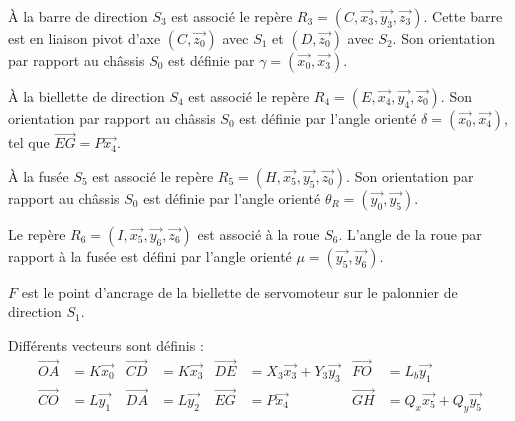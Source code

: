 À la barre de direction $S_3$ est associé le repère $R_3 = (C, \overrightarrow{x_3}, \overrightarrow{y_3}, \overrightarrow{z_3})$. Cette barre est en liaison pivot d'axe $(C, \overrightarrow{z_0})$ avec $S_1$ et $(D, \overrightarrow{z_0})$ avec $S_2$. Son orientation par rapport au châssis $S_0$ est définie par $\gamma = (\overrightarrow{x_0}, \overrightarrow{x_3})$.

À la biellette de direction $S_4$ est associé le repère $R_4 = (E, \overrightarrow{x_4}, \overrightarrow{y_4}, \overrightarrow{z_0})$. Son orientation par rapport au châssis $S_0$ est définie par l'angle orienté $\delta = (\overrightarrow{x_0}, \overrightarrow{x_4})$, tel que $\overrightarrow{EG} = P \overrightarrow{x_4}$.

À la fusée $S_5$ est associé le repère $R_5 = (H, \overrightarrow{x_5}, \overrightarrow{y_5}, \overrightarrow{z_0})$. Son orientation par rapport au châssis $S_0$ est définie par l'angle orienté $\theta_R = (\overrightarrow{y_0}, \overrightarrow{y_5})$.

Le repère $R_6 = (I, \overrightarrow{x_5}, \overrightarrow{y_6}, \overrightarrow{z_6})$ est associé à la roue $S_6$. L'angle de la roue par rapport à la fusée est défini par l'angle orienté $\mu = (\overrightarrow{y_5}, \overrightarrow{y_6})$.

$F$ est le point d'ancrage de la biellette de servomoteur sur le palonnier de direction $S_1$.

Différents vecteurs sont définis :
\begin{align*}
\overrightarrow{OA} &= K \overrightarrow{x_0} & \overrightarrow{CD} &= K \overrightarrow{x_3}  & \overrightarrow{DE} &= X_3 \overrightarrow{x_3} + Y_3 \overrightarrow{y_3} & \overrightarrow{FO} &= L_b \overrightarrow{y_1}\\
\overrightarrow{CO} &= L \overrightarrow{y_1} & \overrightarrow{DA} &= L \overrightarrow{y_2} &\overrightarrow{EG} &= P \overrightarrow{x_4} & \overrightarrow{GH} &= Q_x \overrightarrow{x_5} + Q_y \overrightarrow{y_5}
\end{align*}



~\

